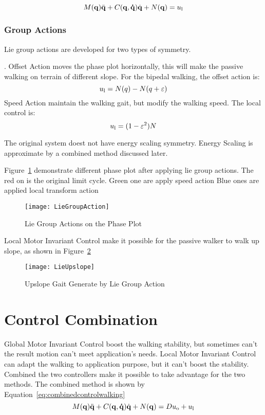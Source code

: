 \begin{equation}
\label{eq:localcontrolwalking}
M(\mathbf{q}) \ddot{\mathbf{q}} + C(\mathbf{q,\dot{q}})\dot{\mathbf{q}} + N(\mathbf{q}) = u_{\mathrm{l}}
\end{equation}

\subsubsection{Group Actions}
Lie group actions are developed for two types of symmetry.
\begin{itemize}

.
Offset Action moves the phase plot horizontally, this will make the passive walking on terrain of different slope.
For the bipedal walking, the offset action is:
\[
u_{\mathrm{l}}=N(q)-N(q+\varepsilon)
\]
Speed Action maintain the walking gait, but modify the walking speed.
The local control is:
\[  
u_{\mathrm{l}}=(1-\varepsilon^2)N
\]
\end{itemize}

The original system doest not have energy scaling symmetry.
Energy Scaling is approximate by a combined method discussed later.

Figure~\ref{fig:walkliegroupphase} demonstrate different phase plot after applying lie group actions.
The red on is the original limit cycle.
Green one are apply speed action
Blue ones are applied local transform action


\begin{figure}[!htbp]
  \begin{center}
     \texttt{[image: LieGroupAction]}
    \caption{Lie Group Actions on the Phase Plot}
    \label{fig:walkliegroupphase}
\end{center}
\end{figure}


Local Motor Invariant Control make it possible for the passive walker to walk up slope, as shown in Figure~\ref{fig:liegroupupslope}


\begin{figure}[!htbp]
  \begin{center}
      \texttt{[image: LieUpslope]}
    \caption{Upslope Gait Generate by Lie Group Action}
    \label{fig:liegroupupslope}
\end{center}
\end{figure}

\section{Control Combination}
Global Motor Invariant Control boost the walking stability, but sometimes can't the result motion can't meet application's needs.
Local Motor Invariant Control can adapt the walking to application purpose, but it can't boost the stability.
Combined the two controllers make it possible to take advantage for the two methods.
The combined method is shown by Equation~\ref{eq:combinedcontrolwalking}
\begin{equation}
\label{eq:combinedcontrolwalking}
M(\mathbf{q}) \ddot{\mathbf{q}} + C(\mathbf{q,\dot{q}})\dot{\mathbf{q}} + N(\mathbf{q}) = Du_{\mathrm{o}}+u_{\mathrm{l}}
\end{equation}


